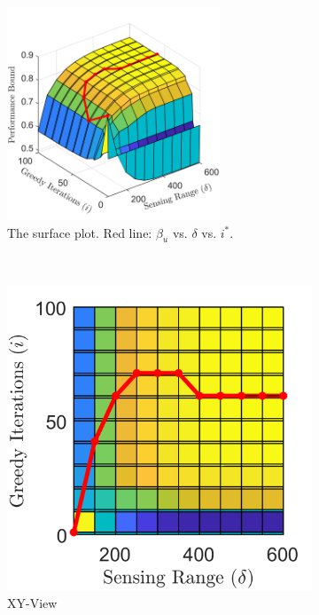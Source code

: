 \documentclass[conference]{IEEEtran}
\begin{document}
\begin{figure}[!h]
    \centering
    \begin{subfigure}[t]{\columnwidth}
        \centering
        \includegraphics[width=2.5in]{Figures/Gen1_Exd.png}
        \caption{The surface plot. Red line: $\beta_u$ vs. $\delta$  vs. $i^*$.}
    \end{subfigure}%
    \\
    \centering
    \begin{subfigure}[t]{0.17\textwidth}
        \centering
        \includegraphics[width=\textwidth]{Figures/Gen1_Exd2.png}
        \caption{XY-View}
    \end{subfigure}
    \hspace{3mm}
    \begin{subfigure}[t]{0.17\textwidth}

\end{subfigure}
\end{figure}
\end{document}
